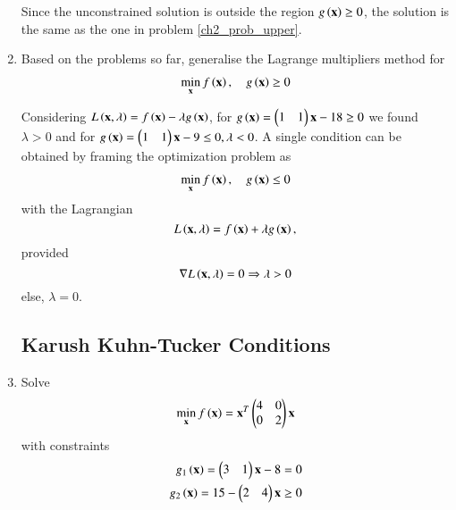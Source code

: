 \documentclass[journal,12pt,twocolumn]{IEEEtran}
\renewcommand\thesection{\arabic{section}}
\begin{document}
\begin{enumerate}[label=\thesection.\arabic*,ref=\thesection.\theenumi]
%
\solution Since the unconstrained solution is outside the region $g\left(\mathbf{x}\right) \geq 0$, the solution is the same as the one in problem \ref{ch2_prob_upper}.
%
\item
Based on the problems so far, generalise the Lagrange multipliers method for 
%
	 \begin{align}
	 \label{ch2_lagrange_ineq}
	\min_{\mbf{x}} f\brak{\mbf{x}} , \quad 
	 g\brak{\mbf{x}}  \geq 0 
	 \end{align}
%

%
\solution
Considering $L\left(\mathbf{x},\lambda\right) = f\left(\mathbf{x}\right) - \lambda g\left(\mathbf{x}\right)$, for $g\left(\mathbf{x}\right) = \begin{pmatrix}1 & 1\end{pmatrix}\mathbf{x} - 18 \geq 0$ we found $\lambda > 0 $ and for $g\left(\mathbf{x}\right) = \begin{pmatrix}1 & 1\end{pmatrix}\mathbf{x} - 9 \leq 0, \lambda < 0$. A single condition can be obtained by framing the optimization problem as
%
	 \begin{align}
	 \label{ch2_lagrange_ineq_summary}
	\min_{\mbf{x}} f\brak{\mbf{x}} , \quad 
	 g\brak{\mbf{x}}  \leq 0 
	 \end{align}
%
with the Lagrangian
%
\begin{equation}
L\brak{\mbf{x},\lambda} = f\brak{\mbf{x}} + \lambda g\brak{\mbf{x}}, %
\end{equation}
%
provided
%
\begin{equation}
\label{ch2_kkt_necessary}
\nabla L\brak{\mbf{x},\lambda} = 0 \Rightarrow \lambda > 0
\end{equation}
else, $\lambda = 0$.
\subsection{Karush Kuhn-Tucker Conditions}
\item
Solve
 \begin{align}
 \label{ch2_kkt_problem}
\min_{\mbf{x}} f\brak{\mbf{x}} = \vec{x}^T\myvec{4 & 0 \\0 & 2}\vec{x}
 \end{align}
 with constraints
 \begin{align}
 g_1\left(\mathbf{x}\right) = \begin{pmatrix}3 & 1\end{pmatrix}\mathbf{x}-8 = 0\\
 g_2 \left(\mathbf{x}\right)= 15 - \begin{pmatrix}2 & 4\end{pmatrix}\mathbf{x} \geq 0
 \end{align}
 

\end{enumerate}
\end{document}
